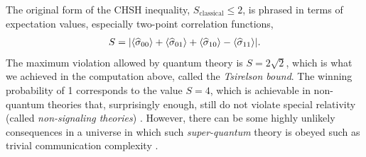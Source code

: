 The original form of the CHSH inequality, $S_{\textrm{classical}} \le 2$, is phrased in terms of expectation values, especially two-point correlation functions,
\begin{align}
	S = \abs{\left\langle \widehat{\sigma}_{00} \right\rangle + \left\langle \widehat{\sigma}_{01} \right\rangle + \left\langle \widehat{\sigma}_{10} \right\rangle - \left\langle \widehat{\sigma}_{11} \right\rangle}.
\end{align}
The maximum violation allowed by quantum theory is $S = 2\sqrt{2}$, which is what we achieved in the computation above, called the \emph{Tsirelson bound}. The winning probability of 1 corresponds to the value $S=4$, which is achievable in non-quantum theories that, surprisingly enough, still do not violate special relativity (called \emph{non-signaling theories}) \cite{pr-box}. However, there can be some highly unlikely consequences in a universe in which such  \emph{super-quantum} theory is obeyed such as trivial communication complexity \cite{vandam2012}.


